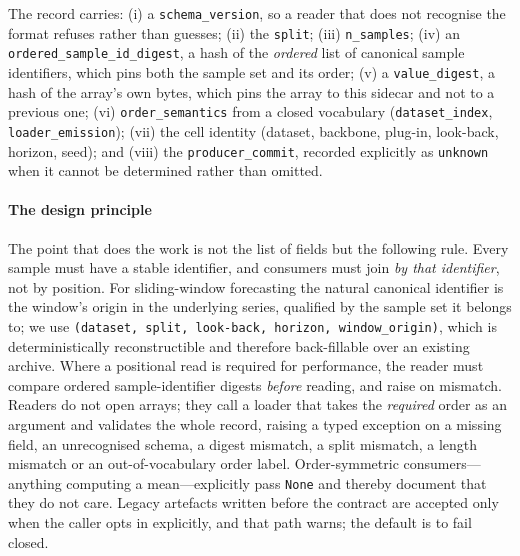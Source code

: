 \documentclass[a4paper,fleqn]{cas-sc}
\begin{document}
The record carries: (i) a \texttt{schema\_version}, so a reader that does not
recognise the format refuses rather than guesses; (ii) the \texttt{split}; (iii)
\texttt{n\_samples}; (iv) an \texttt{ordered\_sample\_id\_digest}, a hash of the
\emph{ordered} list of canonical sample identifiers, which pins both the sample set
and its order; (v) a \texttt{value\_digest}, a hash of the array's own bytes, which
pins the array to this sidecar and not to a previous one; (vi)
\texttt{order\_semantics} from a closed vocabulary
(\texttt{dataset\_index}, \texttt{loader\_emission}); (vii) the cell identity
(dataset, backbone, plug-in, look-back, horizon, seed); and (viii) the
\texttt{producer\_commit}, recorded explicitly as \texttt{unknown} when it cannot
be determined rather than omitted.

\paragraph{The design principle}
The point that does the work is not the list of fields but the following rule.
Every sample must have a stable identifier, and consumers must join \emph{by that
identifier}, not by position. For sliding-window forecasting the natural canonical
identifier is the window's origin in the underlying series, qualified by the sample
set it belongs to; we use
\texttt{(dataset, split, look-back, horizon, window\_origin)}, which is
deterministically reconstructible and therefore back-fillable over an existing
archive. Where a positional read is required for performance, the reader must
compare ordered sample-identifier digests \emph{before} reading, and raise on
mismatch. Readers do not open
arrays; they call a loader that takes the \emph{required} order as an argument and
validates the whole record, raising a typed exception on a missing field, an
unrecognised schema, a digest mismatch, a split mismatch, a length mismatch or an
out-of-vocabulary order label. Order-symmetric consumers---anything computing a
mean---explicitly pass
\texttt{None} and thereby document that they do not care. Legacy artefacts written
before the contract are accepted only when the caller opts in explicitly, and that
path warns; the default is to fail closed.
\end{document}
